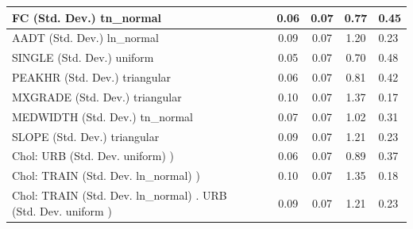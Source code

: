 \begin{table}
\begin{center}
\begin{tabular}{|l|l|c|c|c|l|}
			\hline
			FC (Std. Dev.) tn_normal &  & 0.06 & 0.07 & 0.77 & 0.45 \\
			\hline
			AADT (Std. Dev.) ln_normal &  & 0.09 & 0.07 & 1.20 & 0.23 \\
			\hline
			SINGLE (Std. Dev.) uniform &  & 0.05 & 0.07 & 0.70 & 0.48 \\
			\hline
			PEAKHR (Std. Dev.) triangular &  & 0.06 & 0.07 & 0.81 & 0.42 \\
			\hline
			MXGRADE (Std. Dev.) triangular &  & 0.10 & 0.07 & 1.37 & 0.17 \\
			\hline
			MEDWIDTH (Std. Dev.) tn_normal &  & 0.07 & 0.07 & 1.02 & 0.31 \\
			\hline
			SLOPE (Std. Dev.) triangular &  & 0.09 & 0.07 & 1.21 & 0.23 \\
			\hline
			 Chol: URB (Std. Dev. uniform) ) &  & 0.06 & 0.07 & 0.89 & 0.37 \\
			\hline
			 Chol: TRAIN (Std. Dev. ln_normal) ) &  & 0.10 & 0.07 & 1.35 & 0.18 \\
			\hline
			 Chol: TRAIN (Std. Dev. ln_normal) . URB (Std. Dev.   uniform ) &  & 0.09 & 0.07 & 1.21 & 0.23 \\
			\hline
		\end{tabular}
	\end{center}
\end{table}
